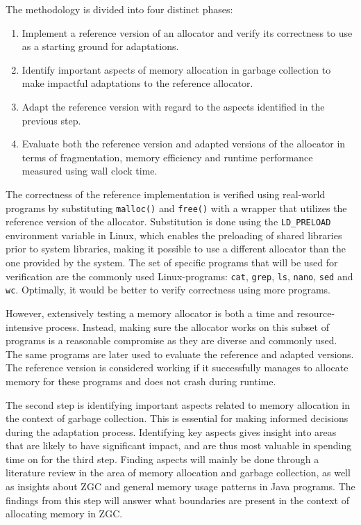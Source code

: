 
The methodology is divided into four distinct phases:

\begin{enumerate}
    \item Implement a reference version of an allocator and verify its correctness to use as a starting ground for adaptations.
    \item Identify important aspects of memory allocation in garbage collection to make impactful adaptations to the reference allocator.
    \item Adapt the reference version with regard to the aspects identified in the previous step.
    \item Evaluate both the reference version and adapted versions of the allocator in terms of fragmentation, memory efficiency and runtime performance measured using wall clock time.
\end{enumerate}

The correctness of the reference implementation is verified using real-world programs by substituting \texttt{malloc()} and \texttt{free()} with a wrapper that utilizes the reference version of the allocator. Substitution is done using the \texttt{LD\_PRELOAD} environment variable in Linux, which enables the preloading of shared libraries prior to system libraries, making it possible to use a different allocator than the one provided by the system. The set of specific programs that will be used for verification are the commonly used Linux-programs: \texttt{cat}, \texttt{grep}, \texttt{ls}, \texttt{nano}, \texttt{sed} and \texttt{wc}. Optimally, it would be better to verify correctness using more programs.

However, extensively testing a memory allocator is both a time and resource-intensive process. Instead, making sure the allocator works on this subset of programs is a reasonable compromise as they are diverse and commonly used. The same programs are later used to evaluate the reference and adapted versions. The reference version is considered working if it successfully manages to allocate memory for these programs and does not crash during runtime.

The second step is identifying important aspects related to memory allocation in the context of garbage collection. This is essential for making informed decisions during the adaptation process. Identifying key aspects gives insight into areas that are likely to have significant impact, and are thus most valuable in spending time on for the third step. Finding aspects will mainly be done through a literature review in the area of memory allocation and garbage collection, as well as insights about ZGC and general memory usage patterns in Java programs. The findings from this step will answer what boundaries are present in the context of allocating memory in ZGC.

